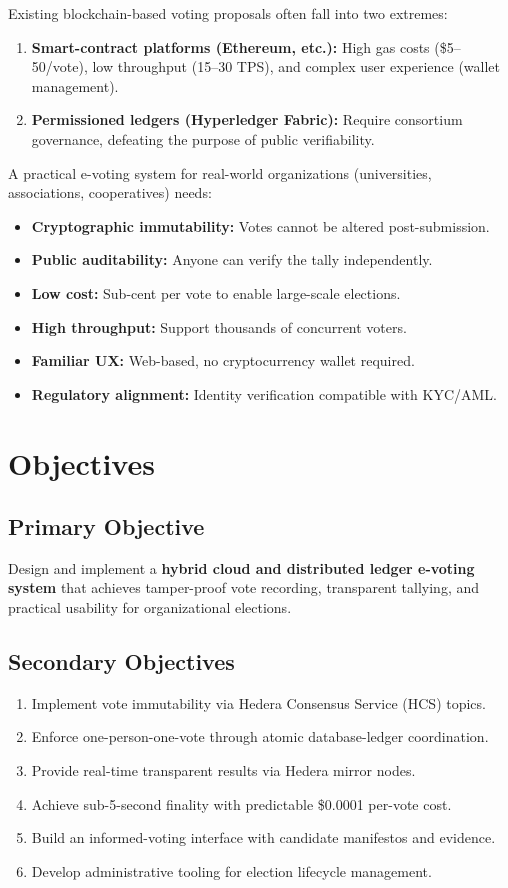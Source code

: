 Existing blockchain-based voting proposals often fall into two extremes:
\begin{enumerate}
    \item \textbf{Smart-contract platforms (Ethereum, etc.):} High gas costs (\$5--50/vote),
    low throughput (15--30 TPS), and complex user experience (wallet management).
    \item \textbf{Permissioned ledgers (Hyperledger Fabric):} Require consortium governance,
    defeating the purpose of public verifiability.
\end{enumerate}

A practical e-voting system for real-world organizations (universities, associations,
cooperatives) needs:
\begin{itemize}
    \item \textbf{Cryptographic immutability:} Votes cannot be altered post-submission.
    \item \textbf{Public auditability:} Anyone can verify the tally independently.
    \item \textbf{Low cost:} Sub-cent per vote to enable large-scale elections.
    \item \textbf{High throughput:} Support thousands of concurrent voters.
    \item \textbf{Familiar UX:} Web-based, no cryptocurrency wallet required.
    \item \textbf{Regulatory alignment:} Identity verification compatible with KYC/AML.
\end{itemize}

\section{Objectives}
\label{sec:objectives}

\subsection{Primary Objective}
Design and implement a \textbf{hybrid cloud and distributed ledger e-voting system}
that achieves tamper-proof vote recording, transparent tallying, and practical
usability for organizational elections.

\subsection{Secondary Objectives}
\begin{enumerate}
    \item Implement vote immutability via Hedera Consensus Service (HCS) topics.
    \item Enforce one-person-one-vote through atomic database-ledger coordination.
    \item Provide real-time transparent results via Hedera mirror nodes.
    \item Achieve sub-5-second finality with predictable \$0.0001 per-vote cost.
    \item Build an informed-voting interface with candidate manifestos and evidence.
    \item Develop administrative tooling for election lifecycle management.
\end{enumerate}

